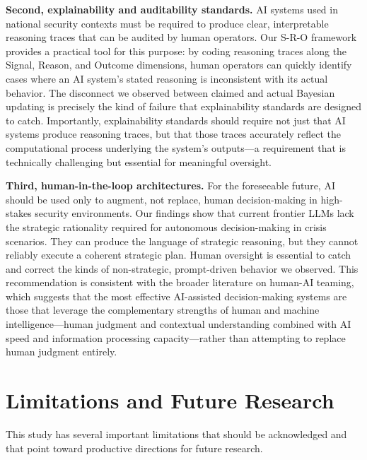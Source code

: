 \documentclass[12pt]{article}
\theoremstyle{plain}
\theoremstyle{definition}
\begin{document}
\textbf{Second, explainability and auditability standards.} AI systems used in national security contexts must be required to produce clear, interpretable reasoning traces that can be audited by human operators. Our S-R-O framework provides a practical tool for this purpose: by coding reasoning traces along the Signal, Reason, and Outcome dimensions, human operators can quickly identify cases where an AI system's stated reasoning is inconsistent with its actual behavior. The disconnect we observed between claimed and actual Bayesian updating is precisely the kind of failure that explainability standards are designed to catch. Importantly, explainability standards should require not just that AI systems produce reasoning traces, but that those traces accurately reflect the computational process underlying the system's outputs---a requirement that is technically challenging but essential for meaningful oversight.

\textbf{Third, human-in-the-loop architectures.} For the foreseeable future, AI should be used only to augment, not replace, human decision-making in high-stakes security environments. Our findings show that current frontier LLMs lack the strategic rationality required for autonomous decision-making in crisis scenarios. They can produce the language of strategic reasoning, but they cannot reliably execute a coherent strategic plan. Human oversight is essential to catch and correct the kinds of non-strategic, prompt-driven behavior we observed. This recommendation is consistent with the broader literature on human-AI teaming, which suggests that the most effective AI-assisted decision-making systems are those that leverage the complementary strengths of human and machine intelligence---human judgment and contextual understanding combined with AI speed and information processing capacity---rather than attempting to replace human judgment entirely.

\section{Limitations and Future Research}

This study has several important limitations that should be acknowledged and that point toward productive directions for future research.
\end{document}
